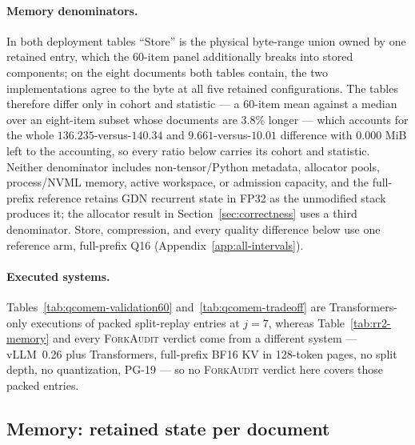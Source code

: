 \documentclass{article}
\newcommand{\method}{\textsc{ForkAudit}}
\begin{document}
\paragraph{Memory denominators.}
\label{sec:denominators}
In both deployment tables ``Store'' is the physical byte-range union owned by
one retained entry, which the 60-item panel additionally breaks into stored
components; on the eight documents both tables contain, the two implementations
agree to the byte at all five retained configurations. The tables therefore
differ only in cohort and statistic --- a 60-item mean against a median over an
eight-item subset whose documents are $3.8\%$ longer --- which accounts for the
whole $136.235$-versus-$140.34$ and $9.661$-versus-$10.01$ difference with
$0.000$ MiB left to the accounting, so every ratio below carries its cohort and
statistic. Neither denominator includes non-tensor/Python metadata, allocator
pools, process/NVML memory, active workspace, or admission capacity, and the
full-prefix reference retains GDN recurrent state in FP32 as the unmodified
stack produces it; the allocator result in Section~\ref{sec:correctness} uses a
third denominator. Store, compression, and every quality difference below use
one reference arm, full-prefix Q16 (Appendix~\ref{app:all-intervals}).

\paragraph{Executed systems.} Tables~\ref{tab:qcomem-validation60}
and~\ref{tab:qcomem-tradeoff} are Transformers-only executions of packed
split-replay entries at $j=7$, whereas Table~\ref{tab:rr2-memory} and every
\method{} verdict come from a different system --- vLLM~0.26 plus Transformers,
full-prefix BF16 KV in 128-token pages, no split depth, no quantization, PG-19
--- so no \method{} verdict here covers those packed entries.

\subsection{Memory: retained state per document}
\label{sec:memory}
\end{document}
